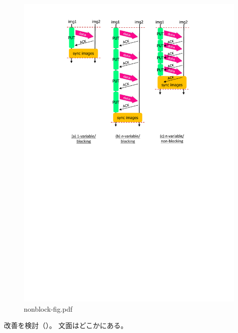 \begin{figure}[tbh]
  \begin{center}
    \mbox{\includegraphics[trim=43mm 144mm 43mm 3mm, scale=0.7,clip]{figs/nonblock-fig-r2.pdf}}
    \caption{nonblock-fig.pdf}\label{fig:nonblock-fig}
  \end{center}
\end{figure}

改善を検討（）。
文面はどこかにある。


